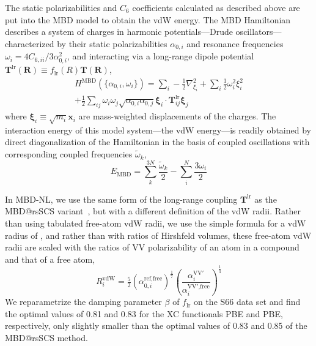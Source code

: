 The static polarizabilities and $C_6$ coefficients calculated as described above are put into the MBD model to obtain the vdW energy.
The MBD Hamiltonian describes a system of charges in harmonic potentials---Drude oscillators---characterized by their static polarizabilities $\alpha_{0,i}$ and resonance frequencies $\omega_i=4C_{6,ii}/3\alpha_{0,i}^2$, and interacting via a long-range dipole potential $\mathbf T^\mathrm{lr}(\mathbf R)\equiv f_\text{lr}(R)\mathbf T(\mathbf R)$,
\begin{multline}
  H^\text{MBD}(\{\alpha_{0,i},\omega_i\})=\sum_i-\frac12\nabla_{\xi_i}^2+\sum_i\frac12\omega_i^2\xi_i^2 \\
  +\frac12\sum_{ij}\omega_i\omega_j\sqrt{\alpha_{0,i}\alpha_{0,j}}\boldsymbol{\xi}_i\cdot\mathbf T^\mathrm{lr}_{ij}\boldsymbol{\xi}_j
\end{multline}
where $\boldsymbol\xi_i\equiv\sqrt{m_i}\mathbf x_i$ are mass-weighted displacements of the charges.
The interaction energy of this model system---the vdW energy---is readily obtained by direct diagonalization of the Hamiltonian in the basis of coupled oscillations with corresponding coupled frequencies $\tilde\omega_k$,
\begin{equation}
  E_\text{MBD}=\sum_k^{3N}\frac{\tilde\omega_k}2-\sum_i^N\frac{3\omega_i}2
\end{equation}

In MBD-NL, we use the same form of the long-range coupling $\mathbf T^\text{lr}$ as the MBD@rsSCS variant~\citep{AmbrosettiJCP14}, but with a different definition of the vdW radii.
Rather than using tabulated free-atom vdW radii, we use the simple formula for a vdW radius of \citet{FedorovPRL18}, and rather than with ratios of Hirshfeld volumes, these free-atom vdW radii are scaled with the ratios of VV polarizability of an atom in a compound and that of a free atom,\begin{equation}
  R_i^\text{vdW}=\tfrac52{(\alpha_{0,i}^\text{ref,free})}^\frac17{\left(\frac{\alpha_i^\mathrm{VV'}}{\alpha_i^\text{VV$'$,free}}\right)}^\frac13
\end{equation}
We reparametrize the damping parameter $\beta$ of $f_\text{lr}$ on the S66 data set and find the optimal values of 0.81 and 0.83 for the XC functionals PBE and PBE, respectively, only slightly smaller than the optimal values of 0.83 and 0.85 of the MBD@rsSCS method.


